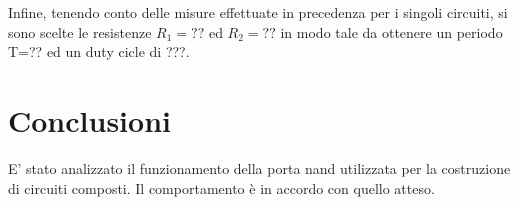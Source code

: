  Infine, tenendo conto delle misure effettuate in precedenza per i singoli circuiti, si sono scelte le resistenze $R_{1}=??$ ed $R_{2}=??$ in modo tale da ottenere un periodo T=?? ed un duty cicle di ???.
 
 \section{Conclusioni}
 E' stato analizzato il funzionamento della porta nand utilizzata per la costruzione di circuiti composti. Il comportamento è in accordo con quello atteso.
